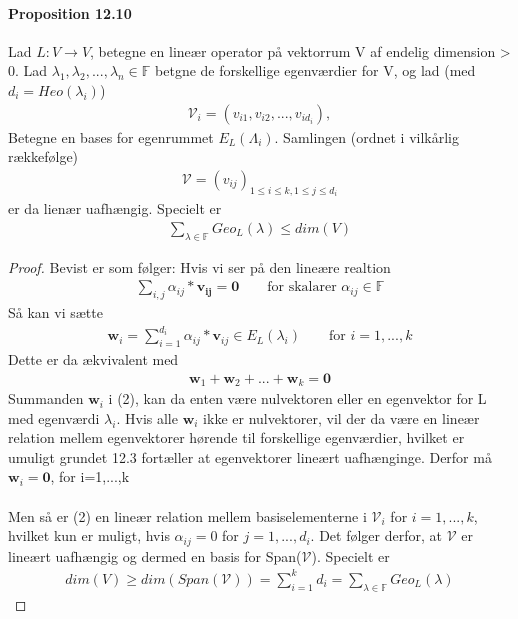 \documentclass[paper=a4, fontsize=11pt]{scrartcl} %
\begin{document}
	\paragraph{Proposition 12.10} Lad $L:V\rightarrow V$, betegne en lineær operator på vektorrum V af endelig dimension > 0. Lad $\lambda_1,\lambda_2,...,\lambda_n\in\mathbb{F}$ betgne de forskellige egenværdier for V, og lad (med $d_i=Heo(\lambda_i)$)
	\begin{align*}
		\mathcal{V}_i=(v_{i1},v_{i2},...,v_{id_i}),
	\end{align*}
	Betegne en bases for egenrummet $E_L(\Lambda_i)$. Samlingen (ordnet i vilkårlig rækkefølge)
	\begin{align*}
		\mathcal{V}=(v_{ij})_{1\leq i\leq k, 1\leq j \leq d_i}
	\end{align*}
	er da lienær uafhængig. Specielt er 
	\begin{align*}
		\sum_{\lambda\in\mathbb{F}}^{}Geo_L(\lambda)\leq dim(V)
	\end{align*}
	
	\begin{proof}
		
		Bevist er som følger:
		Hvis vi ser på den lineære realtion
		\setcounter{equation}{0}
		\begin{align}
			\sum_{i,j}\alpha_{ij}*\mathbf{v_{ij}}=\mathbf{0} \qquad \text{for skalarer } \alpha_{ij}\in\mathbb{F}
		\end{align}
		Så kan vi sætte
		\begin{align}
			\mathbf{w}_i=\sum_{i=1}^{d_i}\alpha_{ij}*\mathbf{v}_{ij}\in E_L(\lambda_i) \qquad \text{for } i=1,...,k
		\end{align}
		Dette er da ækvivalent med 
		\begin{align}
			\mathbf{w}_1+\mathbf{w}_2+...+\mathbf{w}_k=\mathbf{0}
		\end{align}
		Summanden $\mathbf{w}_i$ i (2), kan da enten være nulvektoren eller en egenvektor for L med egenværdi $\lambda_i$. Hvis alle $\mathbf{w}_i$ ikke er nulvektorer, vil der da være en lineær relation mellem egenvektorer hørende til forskellige egenværdier, hvilket er umuligt grundet 12.3 fortæller at egenvektorer lineært uafhænginge. Derfor må $\mathbf{w}_i=\mathbf{0}$, for i=1,...,k\\ \\
		Men så er (2) en lineær relation mellem basiselementerne i $\mathcal{V}_i$ for $i=1,...,k$, hvilket kun er muligt, hvis $\alpha_{ij}=0$ for $j=1,...,d_i$. Det følger derfor, at $\mathcal{V}$ er lineært uafhængig og dermed en basis for Span($\mathcal{V}$). Specielt er 
		\begin{align*}
			dim(V)\geq dim(Span(\mathcal{V}))=\sum_{i=1}^{k}d_i=\sum_{\lambda\in \mathbb{F}}Geo_L(\lambda)
		\end{align*}
		
		
	\end{proof}
	
\end{document}
